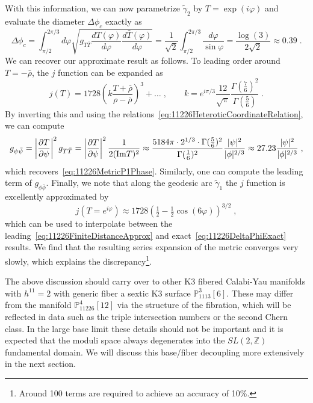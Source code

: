 \documentclass[11pt,a4paper]{article}
\numberwithin{equation}{section}
\numberwithin{table}{section}\setlength{\multlinegap}{25pt}
\begin{document}
With this information, we can now parametrize $\tilde{\gamma}_2$ by $T=\exp(i\varphi)$ and evaluate the diameter $\Delta\phi_c$ exactly as
\begin{equation}
    \label{eq:11226DeltaPhiExact}
    \Delta\phi_c=\int_{\pi/2}^{2\pi/3}d\varphi \sqrt{g_{T\bar{T}}\frac{d T(\varphi)}{d\varphi}\frac{d \bar{T}(\varphi)}{d\varphi}}=\frac{1}{\sqrt{2}}\int_{\pi/2}^{2\pi/3} \frac{d\varphi}{\sin\varphi}=\frac{\log(3)}{2\sqrt{2}}\approx 0.39\;.
\end{equation}
We can recover our approximate result as follows. To leading order around $T=-\bar{\rho}$, the $j$ function can be expanded as~\cite{BayerTravesa:2007}
\begin{equation}
    \label{eq:JFunctionExpansionLeadingOrder}
    j(T)=1728\left(k\frac{T+\bar{\rho}}{\rho-\bar{\rho}}\right)^3+\dots\;,\qquad k=e^{i\pi/3}\frac{12}{\sqrt{\pi}}\frac{\Gamma(\tfrac76)^2}{\Gamma(\tfrac56)}\;.
\end{equation}
By inverting this and using the relations~\eqref{eq:11226HeteroticCoordinateRelation}, we can compute
\begin{equation}
    g_{\psi\bar{\psi}}=\left|\frac{\partial T}{\partial\psi}\right|^2g_{T\bar{T}}=\left|\frac{\partial T}{\partial\psi}\right|^2\frac{1}{2(\textup{Im}T)^2}\approx\frac{5184\pi\cdot 2^{1/3}\cdot\Gamma(\tfrac56)^2}{\Gamma(\tfrac16)^2}\frac{|\psi|^2}{|\phi|^{2/3}}\approx 27.23\frac{|\psi|^2}{|\phi|^{2/3}}\;,
\end{equation}
which recovers~\eqref{eq:11226MetricP1Phase}. Similarly, one can compute the leading term of $g_{\phi\bar{\phi}}$. Finally, we note that along the geodesic arc $\tilde{\gamma}_1$ the $j$ function is excellently approximated by
\begin{equation}
    \label{eq:JFunctionArcApproximation}
    j(T=e^{i\varphi})\approx 1728\left(\tfrac12-\tfrac12\cos(6\varphi)\right)^{3/2}\;,
\end{equation}
which can be used to interpolate between the leading~\eqref{eq:11226FiniteDistanceApprox} and exact~\eqref{eq:11226DeltaPhiExact} results. We find that the resulting series expansion of the metric converges very slowly, which explains the discrepancy\footnote{Around 100 terms are required to achieve an accuracy of 10\%.}.

The above discussion should carry over to other K3 fibered Calabi-Yau manifolds with $h^{11}=2$ with generic fiber a sextic K3 surface $\mathbb{P}^3_{1113}[6]$. These may differ from the manifold $\mathbb{P}^4_{11226}[12]$ via the structure of the fibration, which will be reflected in data such as the triple intersection numbers or the second Chern class. In the large base limit these details should not be important and it is expected that the moduli space always degenerates into the $SL(2,\mathbb{Z})$ fundamental domain. We will discuss this base/fiber decoupling more extensively in the next section.
\end{document}
